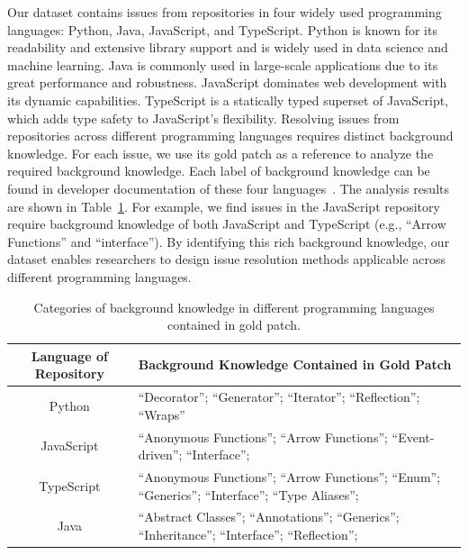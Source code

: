 Our dataset contains issues from repositories in four widely used programming languages: Python, Java, JavaScript, and TypeScript. Python is known for its readability and extensive library support and is widely used in data science and machine learning. Java is commonly used in large-scale applications due to its great performance and robustness. JavaScript dominates web development with its dynamic capabilities. TypeScript is a statically typed superset of JavaScript, which adds type safety to JavaScript's flexibility.
Resolving issues from repositories across different programming languages requires distinct background knowledge. For each issue, we use its gold patch as a reference to analyze the required background knowledge. Each label of background knowledge can be found in developer documentation of these four languages~\cite{jsDocs,tsDocs,javaDocs,pythonDocs}. The analysis results are shown in Table~\ref{table:languageFeatures}. For example, we find issues in the JavaScript repository require background knowledge of both JavaScript and TypeScript (e.g., ``Arrow Functions'' and ``interface''). By identifying this rich background knowledge, our dataset enables researchers to design issue resolution methods applicable across different programming languages.

\begin{table}[t]
\scriptsize
\centering
\caption{Categories of background knowledge in different programming languages contained in gold patch.}
\label{table:languageFeatures}
\tabmargin
\begin{tabular}{c l}
\toprule
    \bf{Language of Repository}  & \bf{Background Knowledge Contained in Gold Patch} \\
\midrule
    Python  & ``Decorator''; ``Generator''; ``Iterator''; ``Reflection''; ``Wraps''\\
    JavaScript & ``Anonymous Functions''; ``Arrow Functions''; ``Event-driven''; ``Interface''; \\
    TypeScript  & ``Anonymous Functions''; ``Arrow Functions''; ``Enum''; ``Generics''; ``Interface''; ``Type Aliases'';  \\
    Java  & ``Abstract Classes''; ``Annotations''; ``Generics''; ``Inheritance''; ``Interface'';  ``Reflection'';  \\
\bottomrule
\end{tabular}

\end{table}

